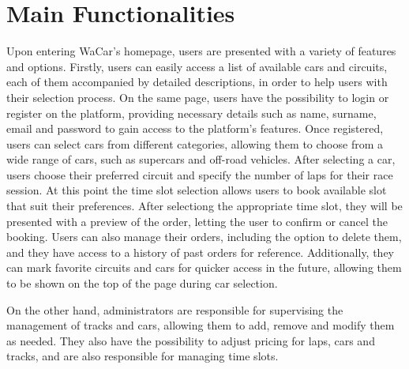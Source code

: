 \section{Main Functionalities}

Upon entering WaCar's homepage, users are presented with a variety of features and options.
Firstly, users can easily access a list of available cars and circuits, each of them accompanied by detailed descriptions, in order to help users with their selection process.
On the same page, users have the possibility to login or register on the platform, providing necessary details such as name, surname, email and password to gain access to the platform's features.
Once registered, users can select cars from different categories, allowing them to choose from a wide range of cars, such as supercars and off-road vehicles.
After selecting a car, users choose their preferred circuit and specify the number of laps for their race session.
At this point the time slot selection allows users to book available slot that suit their preferences.
After selectiong the appropriate time slot, they will be presented with a preview of the order, letting the user to confirm or cancel the booking.
Users can also manage their orders, including the option to delete them, and they have access to a history of past orders for reference.
Additionally, they can mark favorite circuits and cars for quicker access in the future, allowing them to be shown on the top of the page during car selection.

On the other hand, administrators are responsible for supervising the management of tracks and cars, allowing them to add, remove and modify them as needed.
They also have the possibility to adjust pricing for laps, cars and tracks, and are also responsible for managing time slots.